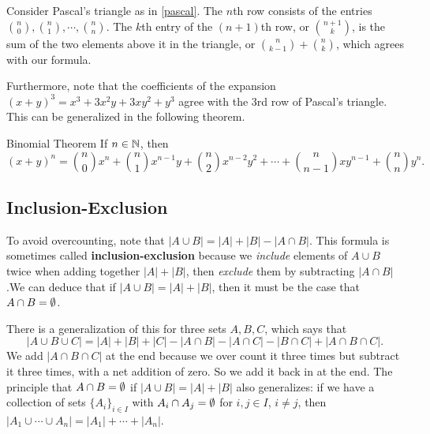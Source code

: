Consider Pascal's triangle as in \cref{pascal}. The $n$th row consists of the entries ${n\choose 0} ,{n\choose 1} ,\cdots ,{n\choose n} $. The $k$th entry of the $(n+1)$th row, or ${n+1\choose k} $, is the sum of the two elements above it in the triangle, or ${n\choose k-1} +{n\choose k} $, which agrees with our formula.

Furthermore, note that the coefficients of the expansion $(x+y)^3=x^3+3x^2y+3xy^2+y^3$ agree with the 3rd row of Pascal's triangle. This can be generalized in the following theorem.
\begin{namedthm}{Binomial Theorem} 
   If $n \in \mathbb{N}$, then \[
       (x+y)^n  = {n\choose 0} x^n +{n\choose 1} x^{n-1}y+{n\choose 2} x^{n-2}y^2 + \cdots + {n\choose n-1} xy^{n-1}+{n\choose n} y^n .
   \]  
\end{namedthm}

\subsection{Inclusion-Exclusion}
To avoid overcounting, note that $|A \cup B|=|A|+|B|-|A\cap B|$. This formula is sometimes called \textbf{inclusion-exclusion} because we \emph{include} elements of $A \cup B$ twice when adding together $|A|+|B|$, then \emph{exclude} them by subtracting $|A \cap B|$.We can deduce that if $|A \cup B|=|A|+|B|$, then it must be the case that $A\cap B=\emptyset$.

There is a generalization of this for three sets $A,B,C$, which says that \[
|A \cup B\cup C|=|A|+|B|+|C| -|A\cap B|-|A\cap C|-|B\cap C|+|A\cap B\cap C|.
\] We add $|A \cap B\cap C|$ at the end because we over count it three times but subtract it three times, with a net addition of zero. So we add it back in at the end. The principle that $A\cap B=\emptyset$ if $|A \cup B|=|A|+|B|$ also generalizes: if we have a collection of sets $\{A_i \} _{i \in I}$ with $A_i  \cap A_j =\emptyset$ for $i, j \in I$, $i\neq j$, then $|A_1 \cup  \cdots \cup A_n |=|A_1|+ \cdots + |A_n |$.

